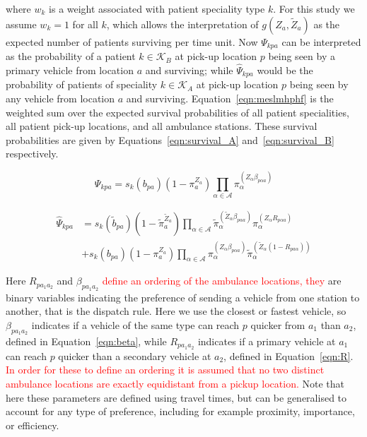 \documentclass[numbers,webpdf,imaman]{ima-authoring-template}%
\begin{document}
\noindent
where $w_k$ is a weight associated with patient speciality type $k$. For this
study we assume $w_k = 1$ for all $k$, which allows the interpretation of
$g\left(Z_a, \tilde{Z}_a\right)$ as the expected number of patients surviving
per time unit. Now $\Psi_{kpa}$ can be interpreted as
the probability of a patient $k \in \mathcal{K}_B$ at pick-up location $p$
being seen by a primary vehicle from location $a$ and surviving; while
$\hat{\Psi}_{kpa}$ would be the probability of patients of speciality
$k \in \mathcal{K}_A$ at pick-up location $p$ being seen by any vehicle from
location $a$ and surviving. Equation~\ref{eqn:meslmhphf} is the weighted sum
over the expected survival probabilities of all patient specialities, all
patient pick-up locations, and all ambulance stations. These survival
probabilities are given by Equations~\ref{eqn:survival_A}
and~\ref{eqn:survival_B} respectively.

\begin{equation}\label{eqn:survival_A}
\Psi_{kpa} = s_k\left( b_{pa} \right)
\left(1 - \pi_{a}^{Z_a} \right)
\prod_{\alpha \in \mathcal{A}}
\pi_{\alpha}^{\left(Z_{\alpha} \beta_{p\alpha a} \right)}
\end{equation}

\begin{align}\label{eqn:survival_B}
\hat{\Psi}_{kpa} &= s_k\left(\tilde{b}_{pa}\right)
\left(1 - \tilde{\pi}_{a}^{\tilde{Z}_a} \right)
\prod_{\alpha \in \mathcal{A}}
\tilde{\pi}_{\alpha}^{\left(\tilde{Z}_{\alpha} \beta_{p\alpha a}\right)}
\pi_{\alpha}^{\left(Z_{\alpha} R_{p \alpha a}\right) } \nonumber \\
&+ s_k\left(b_{pa}\right) \left(1 - \pi_{a}^{Z_a} \right)
\prod_{\alpha \in \mathcal{A}}
\pi_{\alpha}^{\left(Z_{\alpha}\beta_{p\alpha a}\right)}
\tilde{\pi}_{\alpha}^{\left(\tilde{Z}_{\alpha}
\left(1 - R _{p a\alpha}\right)\right)}
\end{align}

Here $R_{p a_1 a_2}$ and $\beta_{p a_1 a_2}$ \textcolor{red}{define an ordering
of the ambulance locations, they} are binary variables indicating the preference
of sending a vehicle from one station to another, that is the dispatch rule.
Here we use the closest or fastest vehicle, so $\beta_{p a_1 a_2}$ indicates if
a vehicle of the same type can reach $p$ quicker from $a_1$ than $a_2$, defined
in Equation~\ref{eqn:beta}, while $R_{p a_1 a_2}$ indicates if a primary vehicle
at $a_1$ can reach $p$ quicker than a secondary vehicle at $a_2$, defined in
Equation~\ref{eqn:R}. \textcolor{red}{In order for these to define an ordering
it is assumed that no two distinct ambulance locations are exactly equidistant
from a pickup location.} Note that here these parameters are defined using
travel times, but can be generalised to account for any type of preference,
including for example proximity, importance, or efficiency.
\end{document}
